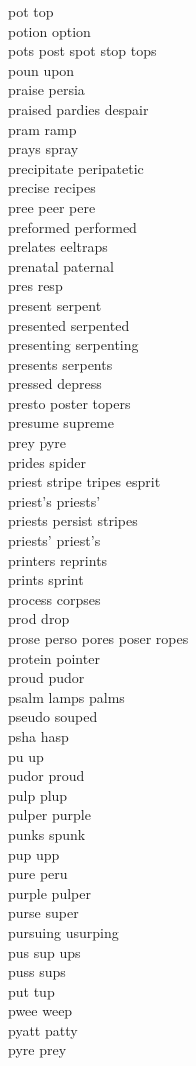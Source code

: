 pot top\\
potion option\\
pots post spot stop tops\\
poun upon\\
praise persia\\
praised pardies despair\\
pram ramp\\
prays spray\\
precipitate peripatetic\\
precise recipes\\
pree peer pere\\
preformed performed\\
prelates eeltraps\\
prenatal paternal\\
pres resp\\
present serpent\\
presented serpented\\
presenting serpenting\\
presents serpents\\
pressed depress\\
presto poster topers\\
presume supreme\\
prey pyre\\
prides spider\\
priest stripe tripes esprit\\
priest's priests'\\
priests persist stripes\\
priests' priest's\\
printers reprints\\
prints sprint\\
process corpses\\
prod drop\\
prose perso pores poser ropes\\
protein pointer\\
proud pudor\\
psalm lamps palms\\
pseudo souped\\
psha hasp\\
pu up\\
pudor proud\\
pulp plup\\
pulper purple\\
punks spunk\\
pup upp\\
pure peru\\
purple pulper\\
purse super\\
pursuing usurping\\
pus sup ups\\
puss sups\\
put tup\\
pwee weep\\
pyatt patty\\
pyre prey\\

